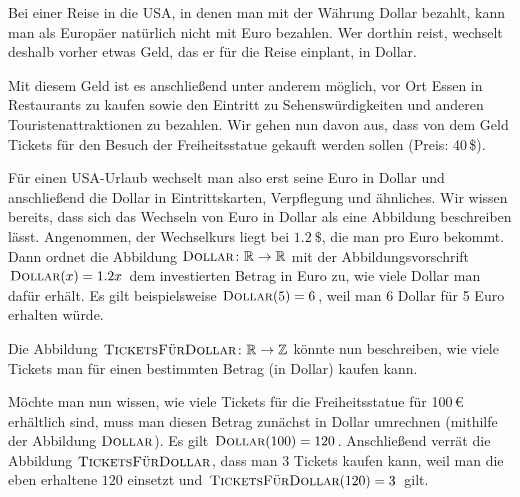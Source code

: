 \documentclass[../../main.tex]{subfiles}
\begin{document}
\begin{example}{}
    Bei einer Reise in die USA, in denen man mit der Währung Dollar bezahlt, kann man als Europäer natürlich nicht mit Euro bezahlen. Wer dorthin reist, wechselt deshalb vorher etwas Geld, das er für die Reise einplant, in Dollar.
    
    Mit diesem Geld ist es anschließend unter anderem möglich, vor Ort Essen in Restaurants zu kaufen sowie den Eintritt zu Sehenswürdigkeiten und anderen Touristenattraktionen zu bezahlen. Wir gehen nun davon aus, dass von dem Geld Tickets für den Besuch der Freiheitsstatue gekauft werden sollen (Preis: 40\,\$).
    
    Für einen USA-Urlaub wechselt man also erst seine Euro in Dollar und anschließend die Dollar in Eintrittskarten, Verpflegung und ähnliches. Wir wissen bereits, dass sich das Wechseln von Euro in Dollar als eine Abbildung beschreiben lässt. Angenommen, der Wechselkurs liegt bei $1.2\:\$$, die man pro Euro bekommt. Dann ordnet die Abbildung $\textsc{Dollar}\colon\mathbb{R}\rightarrow\mathbb{R}$ mit der Abbildungsvorschrift $\textsc{Dollar}(x)=1.2x$ dem investierten Betrag in Euro zu, wie viele Dollar man dafür erhält. Es gilt beispielsweise $\textsc{Dollar}(5)=6$, weil man 6 Dollar für 5 Euro erhalten würde.
    
    Die Abbildung $\textsc{TicketsFürDollar}\colon\mathbb{R}\rightarrow\mathbb{Z}$ könnte nun beschreiben, wie viele Tickets man für einen bestimmten Betrag (in Dollar) kaufen kann.
    
    Möchte man nun wissen, wie viele Tickets für die Freiheitsstatue für 100\,€ erhältlich sind, muss man diesen Betrag zunächst in Dollar umrechnen (mithilfe der Abbildung $\textsc{Dollar}$). Es gilt $\textsc{Dollar}(100)=120$. Anschließend verrät die Abbildung $\textsc{TicketsFürDollar}$, dass man $3$ Tickets kaufen kann, weil man die eben erhaltene $120$ einsetzt und $\textsc{TicketsFürDollar}(120)=3$ gilt.
    

\end{example}
\end{document}
